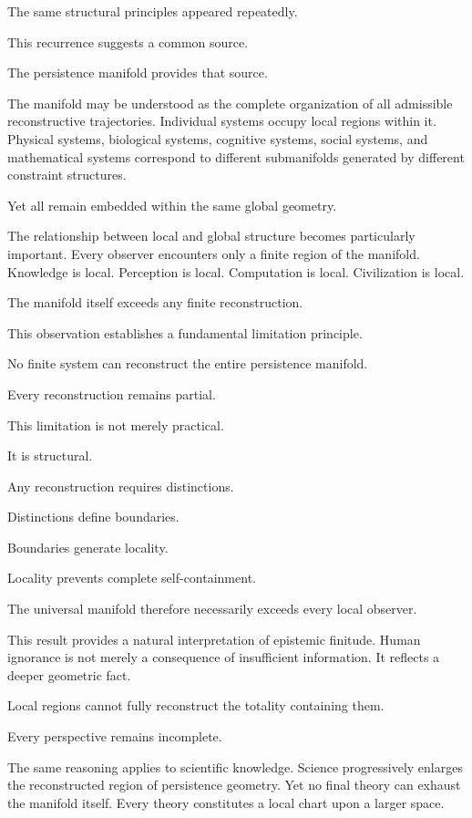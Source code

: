 \documentclass[12pt,oneside]{article}
\theoremstyle{definition}
\begin{document}
The same structural principles appeared repeatedly.

This recurrence suggests a common source.

The persistence manifold provides that source.

The manifold may be understood as the complete organization of all admissible reconstructive trajectories. Individual systems occupy local regions within it. Physical systems, biological systems, cognitive systems, social systems, and mathematical systems correspond to different submanifolds generated by different constraint structures.

Yet all remain embedded within the same global geometry.

The relationship between local and global structure becomes particularly important. Every observer encounters only a finite region of the manifold. Knowledge is local. Perception is local. Computation is local. Civilization is local.

The manifold itself exceeds any finite reconstruction.

This observation establishes a fundamental limitation principle.

No finite system can reconstruct the entire persistence manifold.

Every reconstruction remains partial.

This limitation is not merely practical.

It is structural.

Any reconstruction requires distinctions.

Distinctions define boundaries.

Boundaries generate locality.

Locality prevents complete self-containment.

The universal manifold therefore necessarily exceeds every local observer.

This result provides a natural interpretation of epistemic finitude. Human ignorance is not merely a consequence of insufficient information. It reflects a deeper geometric fact.

Local regions cannot fully reconstruct the totality containing them.

Every perspective remains incomplete.

The same reasoning applies to scientific knowledge. Science progressively enlarges the reconstructed region of persistence geometry. Yet no final theory can exhaust the manifold itself. Every theory constitutes a local chart upon a larger space.
\end{document}
